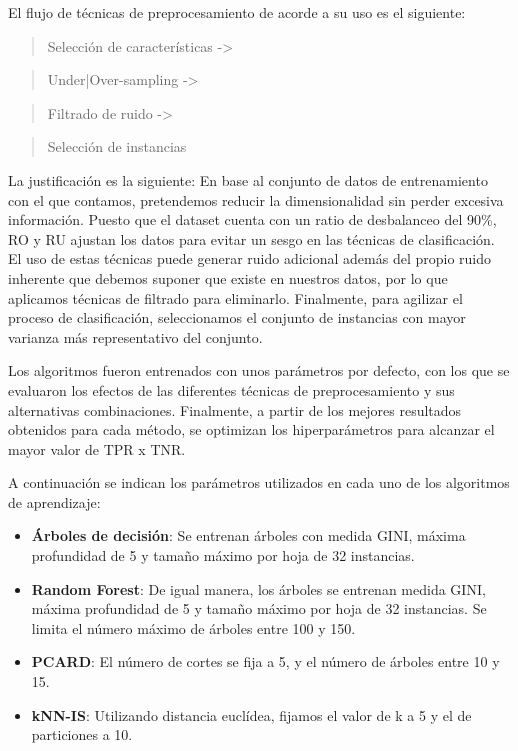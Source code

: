 \vspace{\baselineskip}

El flujo de técnicas de preprocesamiento de acorde a su uso es el siguiente:
\begin{quotation}
    Selección de características ->
\end{quotation}
\begin{quotation}
        Under|Over-sampling -> 
\end{quotation}
\begin{quotation}
      Filtrado de ruido -> 
\end{quotation}
\begin{quotation}
      Selección de instancias
\end{quotation}

\vspace{\baselineskip}

La justificación es la siguiente: En base al conjunto de datos de entrenamiento con el que contamos, pretendemos reducir la dimensionalidad sin perder excesiva información. Puesto que el dataset cuenta con un ratio de desbalanceo del 90\%, RO y RU ajustan los datos para evitar un sesgo en las técnicas de clasificación. El uso de estas técnicas puede generar ruido adicional además del propio ruido inherente que debemos suponer que existe en nuestros datos, por lo que aplicamos técnicas de filtrado para eliminarlo. Finalmente, para agilizar el proceso de clasificación, seleccionamos el conjunto de instancias con mayor varianza más representativo del conjunto.

\newpage

Los algoritmos fueron entrenados con unos parámetros por defecto, con los que se evaluaron los efectos de las diferentes técnicas de preprocesamiento y sus alternativas combinaciones. Finalmente, a partir de los mejores resultados obtenidos para cada método, se optimizan los hiperparámetros para alcanzar el mayor valor de TPR x TNR.

A continuación se indican los parámetros utilizados en cada uno de los algoritmos de aprendizaje:

\begin{itemize}
    \item \textbf{Árboles de decisión}: Se entrenan árboles con medida GINI, máxima profundidad de 5 y tamaño máximo por hoja de 32 instancias.
    \item \textbf{Random Forest}: De igual manera, los árboles se entrenan medida GINI, máxima profundidad de 5 y tamaño máximo por hoja de 32 instancias. Se limita el número máximo de árboles entre 100 y 150.
    \item \textbf{PCARD}: El número de cortes se fija a 5, y el número de árboles entre 10 y 15. 
    \item \textbf{kNN-IS}: Utilizando distancia euclídea, fijamos el valor de k a 5 y el de particiones a 10.
\end{itemize}

